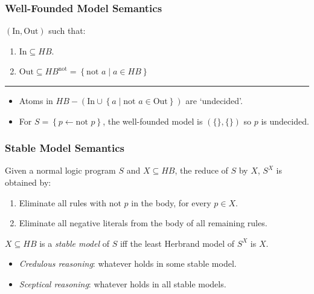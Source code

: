 \documentclass[twocolumn,english]{article}
\begin{document}
\subsubsection{Well-Founded Model Semantics}

$\left(\text{In},\text{Out}\right)$ such that:
\begin{enumerate}
\item $\text{In}\subseteq HB$.
\item $\text{Out}\subseteq HB^{\text{not}}=\left\{ \text{not }a\mid a\in HB\right\} $
\end{enumerate}
\rule[0.5ex]{0.25\columnwidth}{0.5pt}
\begin{itemize}
\item Atoms in $HB-\left(\text{In}\cup\left\{ a\mid\text{not }a\in\text{Out}\right\} \right)$
are `undecided'.
\item For $S=\left\{ p\leftarrow\text{not }p\right\} $, the well-founded
model is $\left(\{\},\{\}\right)$ so $p$ is undecided.
\end{itemize}

\subsubsection{Stable Model Semantics}

Given a normal logic program $S$ and $X\subseteq HB$, the reduce
of $S$ by $X$, $S^{X}$ is obtained by:
\begin{enumerate}
\item Eliminate all rules with $\text{not }p$ in the body, for every $p\in X$.
\item Eliminate all negative literals from the body of all remaining rules.
\end{enumerate}
$X\subseteq HB$ is a \emph{stable model} of $S$ iff the least Herbrand
model of $S^{X}$ is $X$. 
\begin{itemize}
\item \emph{Credulous reasoning}: whatever holds in some stable model.
\item \emph{Sceptical reasoning}: whatever holds in all stable models.
\end{itemize}
\end{document}
